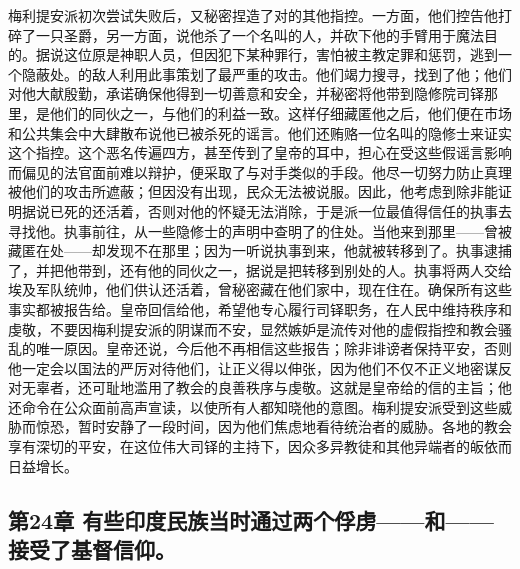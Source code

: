 梅利提安派初次尝试失败后，又秘密捏造了对的其他指控。一方面，他们控告他打碎了一只圣爵，另一方面，说他杀了一个名叫的人，并砍下他的手臂用于魔法目的。据说这位原是神职人员，但因犯下某种罪行，害怕被主教定罪和惩罚，逃到一个隐蔽处。的敌人利用此事策划了最严重的攻击。他们竭力搜寻，找到了他；他们对他大献殷勤，承诺确保他得到一切善意和安全，并秘密将他带到隐修院司铎那里，是他们的同伙之一，与他们的利益一致。这样仔细藏匿他之后，他们便在市场和公共集会中大肆散布说他已被杀死的谣言。他们还贿赂一位名叫的隐修士来证实这个指控。这个恶名传遍四方，甚至传到了皇帝的耳中，担心在受这些假谣言影响而偏见的法官面前难以辩护，便采取了与对手类似的手段。他尽一切努力防止真理被他们的攻击所遮蔽；但因没有出现，民众无法被说服。因此，他考虑到除非能证明据说已死的还活着，否则对他的怀疑无法消除，于是派一位最值得信任的执事去寻找他。执事前往，从一些隐修士的声明中查明了的住处。当他来到那里——曾被藏匿在处——却发现不在那里；因为一听说执事到来，他就被转移到了。执事逮捕了，并把他带到，还有他的同伙之一，据说是把转移到别处的人。执事将两人交给埃及军队统帅，他们供认还活着，曾秘密藏在他们家中，现在住在。确保所有这些事实都被报告给。皇帝回信给他，希望他专心履行司铎职务，在人民中维持秩序和虔敬，不要因梅利提安派的阴谋而不安，显然嫉妒是流传对他的虚假指控和教会骚乱的唯一原因。皇帝还说，今后他不再相信这些报告；除非诽谤者保持平安，否则他一定会以国法的严厉对待他们，让正义得以伸张，因为他们不仅不正义地密谋反对无辜者，还可耻地滥用了教会的良善秩序与虔敬。这就是皇帝给的信的主旨；他还命令在公众面前高声宣读，以使所有人都知晓他的意图。梅利提安派受到这些威胁而惊恐，暂时安静了一段时间，因为他们焦虑地看待统治者的威胁。各地的教会享有深切的平安，在这位伟大司铎的主持下，因众多异教徒和其他异端者的皈依而日益增长。\par


\subsection{第24章 有些印度民族当时通过两个俘虏——和——接受了基督信仰。}

